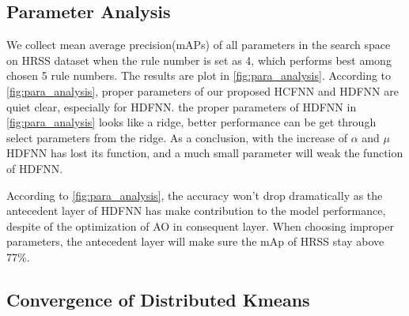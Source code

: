 \documentclass[journal,twocolumn,10pt]{IEEEtran}
\begin{document}
\subsection{Parameter Analysis}
We collect mean average precision(mAPs) of all parameters in the search space on HRSS dataset when the rule number is set as 4, which performs best among chosen 5 rule numbers. The results are plot in \ref{fig:para_analysis}. According to \ref{fig:para_analysis}, proper parameters of our proposed HCFNN and HDFNN are quiet clear, especially for HDFNN. the proper parameters of HDFNN in \ref{fig:para_analysis} looks like a ridge, better performance can be get through select parameters from the ridge. As a conclusion, with the increase of $\alpha$ and $\mu$ HDFNN has lost its function, and a much small parameter will weak the function of HDFNN.

According to \ref{fig:para_analysis}, the accuracy won't drop dramatically as the antecedent layer of HDFNN has make contribution to the model performance, despite of the optimization of AO in consequent layer. When choosing improper parameters, the antecedent layer will make sure the mAp of HRSS stay above 77\%. 
\begin{figure*}[!hbp]
  \centering
  \vspace{3pt}
  \hspace{3pt}
  \vspace{3pt}
  \hspace{3pt}
  \vspace{3pt}
  \vspace{3pt}
  \vspace{3pt}
  \vspace{3pt}
  \vspace{-10pt}
  \centering
  \caption{\normalsize Performance of different parameter settings.}

  \label{fig:para_analysis}

\end{figure*}

\subsection{Convergence of Distributed Kmeans}
\end{document}

